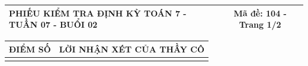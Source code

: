 \documentclass[12pt,a4paper]{article}
\begin{document}
\newpage


\noindent
\begin{tabularx}{\linewidth}{|X|c|}
\hline
\textbf{PHIẾU KIỂM TRA ĐỊNH KỲ TOÁN 7 - TUẦN 07 - BUỔI 02} & \textbf{Mã đề: 104 - Trang 1/2} \\
\hline
\end{tabularx}

\vspace{1.2mm}

\noindent
\begin{tabularx}{\linewidth}{|p{3.2cm}|X|}
\hline
\centering\textbf{ĐIỂM SỐ} & \centering\textbf{LỜI NHẬN XÉT CỦA THẦY CÔ} \tabularnewline
\hline
\rule{0pt}{1.8cm} & \tabularnewline
\hline
\end{tabularx}

\vspace{1.5mm}
\end{document}
